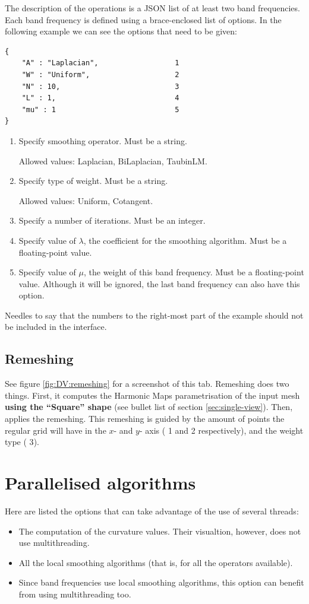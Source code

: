 \documentclass[12pt]{article}
\newcommand \elem[1] {{\color{red} #1}}
\begin{document}
The description of the operations is a JSON list of at least two band
frequencies. Each band frequency is defined using a brace-enclosed list
of options. In the following example we can see the options that need to
be given:
\begin{verbatim}
{
    "A" : "Laplacian",                  1
    "W" : "Uniform",                    2
    "N" : 10,                           3
    "L" : 1,                            4
    "mu" : 1                            5
}
\end{verbatim}
\begin{enumerate}
	\item Specify smoothing operator. Must be a string.
	\hfill
	
	Allowed values: Laplacian, BiLaplacian, TaubinLM.
	\item Specify type of weight. Must be a string.
	\hfill
	
	Allowed values: Uniform, Cotangent.
	\item Specify a number of iterations. Must be an integer.
	\item Specify value of $\lambda$, the coefficient for the smoothing
	algorithm. Must be a floating-point value.
	\item Specify value of $\mu$, the weight of this band frequency.
	Must be a floating-point value. Although it will be ignored, the last
	band frequency can also have this option.
\end{enumerate}

Needles to say that the numbers to the right-most part of the example
should not be included in the interface.

\subsection{Remeshing}
\label{sec:dual-view:remeshing}

See figure \ref{fig:DV:remeshing} for a screenshot of this tab.
Remeshing does two things. First, it computes the Harmonic Maps parametrisation
of the input mesh \textbf{using the ``Square'' shape} (see bullet list of
section \ref{sec:single-view}). Then, applies the remeshing. This remeshing is
guided by the amount of points the regular grid will have in the $x$- and
$y$- axis (\elem{1} and \elem{2} respectively), and the weight type (\elem{3}).

\section{Parallelised algorithms}

Here are listed the options that can take advantage of the use of
several threads:
\begin{itemize}
	\item The computation of the curvature values. Their visualtion, however,
	does not use multithreading.
	\item All the local smoothing algorithms (that is, for all the operators
	available).
	\item Since band frequencies use local smoothing algorithms, this
	option can benefit from using multithreading too.
\end{itemize}
\end{document}
